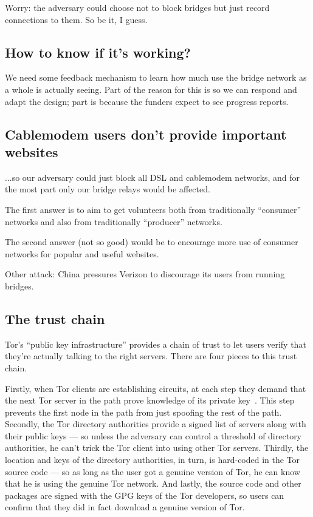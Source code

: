 \documentclass{llncs}
\begin{document}
Worry: the adversary could choose not to block bridges but just record
connections to them. So be it, I guess.

\subsection{How to know if it's working?}

We need some feedback mechanism to learn how much use the bridge network
as a whole is actually seeing. Part of the reason for this is so we can
respond and adapt the design; part is because the funders expect to see
progress reports.

\subsection{Cablemodem users don't provide important websites}

...so our adversary could just block all DSL and cablemodem networks,
and for the most part only our bridge relays would be affected.

The first answer is to aim to get volunteers both from traditionally
``consumer'' networks and also from traditionally ``producer'' networks.

The second answer (not so good) would be to encourage more use of consumer
networks for popular and useful websites.

Other attack: China pressures Verizon to discourage its users from
running bridges.

\subsection{The trust chain}
\label{subsec:trust-chain}

Tor's ``public key infrastructure'' provides a chain of trust to
let users verify that they're actually talking to the right servers.
There are four pieces to this trust chain.

Firstly, when Tor clients are establishing circuits, at each step
they demand that the next Tor server in the path prove knowledge of
its private key~\cite{tor-design}. This step prevents the first node
in the path from just spoofing the rest of the path. Secondly, the
Tor directory authorities provide a signed list of servers along with
their public keys --- so unless the adversary can control a threshold
of directory authorities, he can't trick the Tor client into using other
Tor servers. Thirdly, the location and keys of the directory authorities,
in turn, is hard-coded in the Tor source code --- so as long as the user
got a genuine version of Tor, he can know that he is using the genuine
Tor network. And lastly, the source code and other packages are signed
with the GPG keys of the Tor developers, so users can confirm that they
did in fact download a genuine version of Tor.
\end{document}
